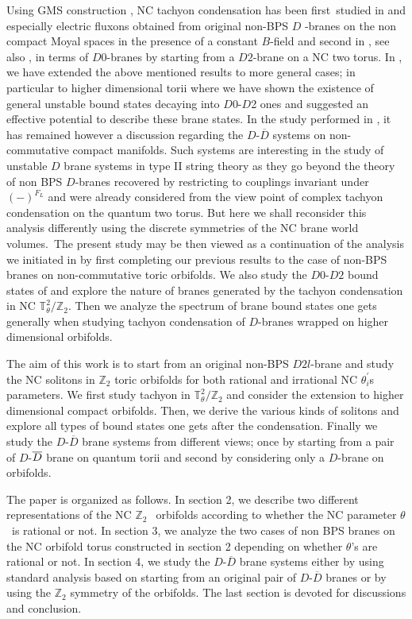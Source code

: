 \documentclass[a4paper,12pt]{article}
\begin{document}
Using GMS construction \cite{e}, NC tachyon condensation has been first\
studied in \cite{f} and especially electric fluxons obtained from original non-BPS $D$%
-branes on the non compact Moyal spaces in the presence of a constant $B$-field
and second in \cite{g}, see also \cite{h,i}, in terms of $D0$-branes
by starting from a $D2$-brane on a NC two torus. In \cite{j}, we have
extended the above mentioned results to more general cases; in particular to
higher dimensional torii where we have shown the existence of general
unstable bound states decaying into $D$0-$D$2 ones and suggested an effective
potential to describe these brane states. In the study performed in \cite{j}%
, it has remained however a discussion regarding the
$D$-$\overline{D}$ systems on non-commutative compact manifolds.
Such systems are interesting in the study of unstable $D$ brane
systems in type II string theory as they go beyond the theory of
non BPS $D$-branes recovered by restricting to couplings invariant
under $(-)^{F_L}$ \cite{k} and were already considered from the
view point of complex tachyon condensation on the quantum two
torus. But here we shall reconsider this analysis differently
using the discrete symmetries of the NC brane world volumes.\ The
present study may be then viewed as a continuation of the analysis
we initiated in \cite{j} by first completing our previous results
to the case of non-BPS branes on non-commutative toric orbifolds.
We also study  the $D0$-$D2$ bound states of \cite{g} and explore
the
nature of branes generated by the tachyon condensation in NC $\mathbb{T}%
_{\theta }^{2}/\mathbb{Z}_{2}$. Then we analyze the spectrum of
brane bound states one gets generally when studying tachyon
condensation of $D$-branes wrapped on higher dimensional
orbifolds.

The aim of this work is to start from an original non-BPS $D2l$-brane and
study the NC solitons in $\mathbb{Z}_{2}$ toric orbifolds for both rational
and irrational NC $\theta _{i}^{\prime }$s parameters.
 We first study tachyon in $\mathbb{T}_{\theta }^{2}/\mathbb{Z}%
_{2}$ and  consider the
extension to higher dimensional compact orbifolds. Then, we derive the
various kinds of solitons and explore all types of bound states one gets after
the condensation. Finally we study the $D$-$\overline{D}$ brane systems
from different views; once by starting from a pair of $D$-$\overline{%
D}$ brane on quantum torii and second by considering only a $D$-brane on
orbifolds.

The paper is organized as follows. In section 2, we describe two
different representations of the NC $\mathbb{Z}_{2\text{ }}$
orbifolds according to whether the NC parameter $\theta $\ is
rational or not. In section 3,
 we analyze the two cases of non BPS branes on the NC orbifold torus
 constructed in section 2 depending on whether $\theta$'s are rational
 or not. In section 4, we study the $D$-$\overline{D}$ brane systems
either by using standard analysis based on starting from an original pair
of
$D$-$\overline{D}$ branes or by using the $\mathbb{Z}_{2}$ symmetry of the
orbifolds. The last section is devoted for discussions and conclusion.
\end{document}
